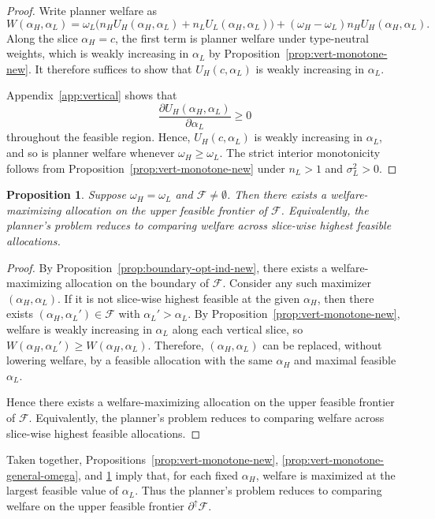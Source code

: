 \documentclass[a4paper,12pt]{article}
\newtheorem{proposition}[theorem]{Proposition}
\theoremstyle{definition}
\theoremstyle{remark}
\newcommand{\1}{\mathbf{1}}
\begin{document}
\begin{proof}
Write planner welfare as
\[
W(\alpha_H,\alpha_L)
=
\omega_L\bigl(n_H U_H(\alpha_H,\alpha_L)+n_L U_L(\alpha_H,\alpha_L)\bigr)
+(\omega_H-\omega_L)n_H U_H(\alpha_H,\alpha_L).
\]
Along the slice \(\alpha_H=c\), the first term is planner welfare under
type-neutral weights, which is weakly increasing in \(\alpha_L\) by
Proposition~\ref{prop:vert-monotone-new}. It therefore suffices to show that
\(U_H(c,\alpha_L)\) is weakly increasing in \(\alpha_L\).

Appendix~\ref{app:vertical} shows that
\[
\frac{\partial U_H(\alpha_H,\alpha_L)}{\partial \alpha_L}\ge 0
\]
throughout the feasible region. Hence, \(U_H(c,\alpha_L)\) is weakly increasing
in \(\alpha_L\), and so is planner welfare whenever \(\omega_H\ge\omega_L\).
The strict interior monotonicity follows from
Proposition~\ref{prop:vert-monotone-new} under \(n_L>1\) and \(\sigma_L^2>0\).
\end{proof}

\begin{proposition}
\label{prop:boundary-upper-general}
Suppose \(\omega_H=\omega_L\) and \(\mathcal F\neq\emptyset\). Then there exists
a welfare-maximizing allocation on the upper feasible frontier of
\(\mathcal F\). Equivalently, the planner's problem reduces to comparing
welfare across slice-wise highest feasible allocations.
\end{proposition}

\begin{proof}
By Proposition~\ref{prop:boundary-opt-ind-new}, there exists a
welfare-maximizing allocation on the boundary of \(\mathcal F\). Consider any
such maximizer \((\alpha_H,\alpha_L)\). If it is not slice-wise highest
feasible at the given \(\alpha_H\), then there exists
\((\alpha_H,\alpha_L')\in\mathcal F\) with \(\alpha_L'>\alpha_L\). By
Proposition~\ref{prop:vert-monotone-new}, welfare is weakly increasing in
\(\alpha_L\) along each vertical slice, so
\(W(\alpha_H,\alpha_L')\ge W(\alpha_H,\alpha_L)\). Therefore,
\((\alpha_H,\alpha_L)\) can be replaced, without lowering welfare, by a
feasible allocation with the same \(\alpha_H\) and maximal feasible
\(\alpha_L\).

Hence there exists a welfare-maximizing allocation on the upper feasible
frontier of \(\mathcal F\). Equivalently, the planner's problem reduces to
comparing welfare across slice-wise highest feasible allocations.
\end{proof}

Taken together, Propositions~\ref{prop:vert-monotone-new},
\ref{prop:vert-monotone-general-omega}, and
\ref{prop:boundary-upper-general} imply that, for each fixed \(\alpha_H\),
welfare is maximized at the largest feasible value of \(\alpha_L\). Thus the
planner's problem reduces to comparing welfare on the upper feasible frontier
\(\partial^\uparrow\mathcal F\).
\end{document}
